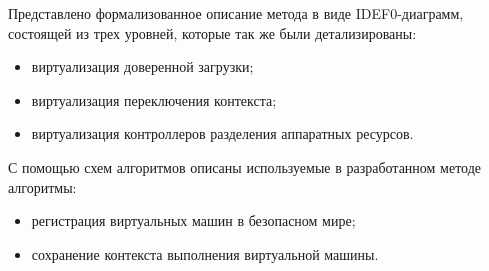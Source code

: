 Представлено формализованное описание метода в виде IDEF0-диаграмм, состоящей из трех уровней, которые так же были детализированы:

\begin{itemize}
	\item виртуализация доверенной загрузки;
	\item виртуализация переключения контекста;
	\item виртуализация контроллеров разделения аппаратных ресурсов.
\end{itemize}

С помощью схем алгоритмов описаны используемые в разработанном методе алгоритмы:

\begin{itemize}
	\item регистрация виртуальных машин в безопасном мире;
	\item сохранение контекста выполнения виртуальной машины.
\end{itemize}

\pagebreak
